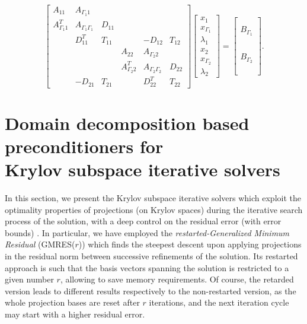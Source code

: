 \begin{equation}
\label{eq:FETIDPFull}
\begin{bmatrix}
A_{11} & A_{\Gamma_1 1} & & & & \\
A_{\Gamma_1 1}^T & A_{\Gamma_1 \Gamma_1} & D_{11} & & &\\
 & D_{11}^T  & T_{11} & \phantom{A} & -D_{12}  & T_{12}\\
& & & A_{22} & A_{\Gamma_2 2} &  \\
& & & A_{\Gamma_2 2}^T & A_{\Gamma_2 \Gamma_2} & D_{22}\\
\phantom{A} & -D_{21}  & T_{21} & & D_{22}^T  & T_{22}
\end{bmatrix}
\begin{bmatrix}
x_{1}\\
x_{\Gamma_1}\\
\lambda_{1}\\
x_{2}\\
x_{\Gamma_2}\\
\lambda_{2}
\end{bmatrix}
=
\begin{bmatrix}
\phantom{x}\\
B_{\Gamma_1}\\
\phantom{x}\\
\phantom{x}\\
B_{\Gamma_2}\\
\phantom{x}\\
\end{bmatrix}.
\end{equation}

\section[DD preconditioners for Krylov solvers]{Domain decomposition based preconditioners for \\Krylov subspace iterative solvers}

In this section, we present the Krylov subspace iterative solvers which exploit the optimality properties of projections (on Krylov spaces) during the iterative search process of the solution, with a deep control on the residual error (with error bounds) \cite{saad2000iterative}. In particular, we have employed the \textit{restarted-Generalized Minimum Residual} (GMRES($r$)) which finds the steepest descent upon applying projections in the residual norm between successive refinements of the solution. Its restarted approach is such that the basis vectors spanning the solution is restricted to a given number $r$, allowing to save memory requirements. Of course, the retarded version leads to different results respectively to the non-restarted version, as the whole projection bases are reset after $r$ iterations, and the next iteration cycle may start with a higher residual error.


